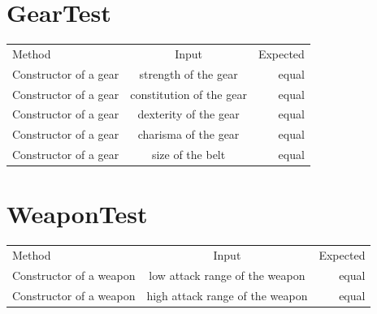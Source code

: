 \documentclass[12pt]{amsart}
\begin{document}
\newpage

\section{GearTest}

\begin{table}[htbp]
   \begin{tabular}{@{} lcr @{}} %

      Method      & Input & Expected \\
         Constructor of a gear       & strength of the gear     &  equal \\
         Constructor of a gear       & constitution of the gear     &  equal \\
         Constructor of a gear       & dexterity of the gear     &  equal \\
         Constructor of a gear       & charisma of the gear     &  equal \\
         Constructor of a gear       & size of the belt     &  equal \\
    \end{tabular}
\end{table}

\section{WeaponTest}

\begin{table}[htbp]
   \begin{tabular}{@{} lcr @{}} %

      Method      & Input & Expected \\
         Constructor of a weapon       & low attack range of the weapon     &  equal \\
         Constructor of a weapon       & high attack range of the weapon      &  equal \\

    \end{tabular}
\end{table}
\end{document}
